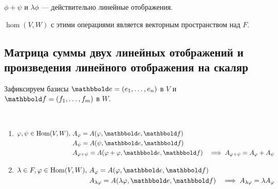 \begin{exercise}
    $\phi + \psi$ и $\lambda \phi$ --- действительно линейные отображения.
\end{exercise}

\begin{exercise}
    $\hom(V, W)$ с этими операциями является векторным пространством над $F$.
\end{exercise}


\subsection{Матрица суммы двух линейных отображений и произведения линейного отображения на скаляр}

Зафиксируем базисы $\E = (e_1, \dots, e_n)$ в $V$ и $\F = (f_1, \dots, f_m)$ в $W$.

\begin{proposal}~
    \begin{enumerate}
    \item
        \begin{math}
            \begin{aligned}[t]
                \phi, \psi \in \hom(V, W), \
                &A_\phi = A(\phi, \E, \F)& \\
                &A_\psi = A(\psi, \E, \F)& \\
                &A_{\phi + \psi} = A(\phi + \phi, \E, \F)& \implies A_{\phi + \psi} = A_\phi + A_\psi
            \end{aligned}
        \end{math}

    \item
        \begin{math}
            \begin{aligned}[t]
                \lambda \in F, \phi \in \hom(V, W), \
                &A_\phi = A(\phi, \E, \F)& \\
                &A_{\lambda \phi} = A(\lambda \phi, \E, \F)& \implies A_{\lambda \phi} = \lambda A_\phi
            \end{aligned}
        \end{math}
    \end{enumerate}
\end{proposal}

